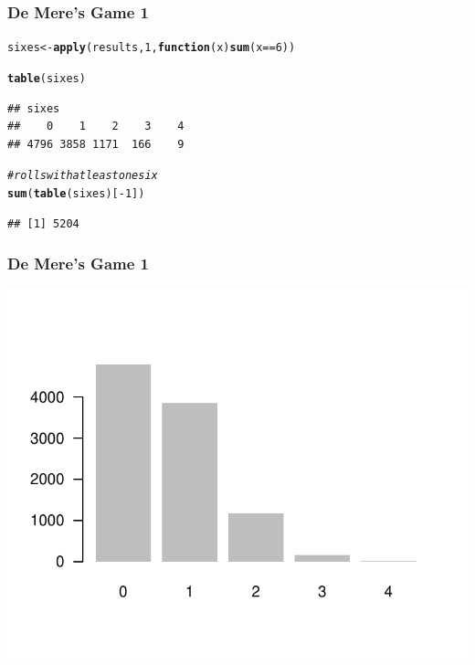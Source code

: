 \documentclass[12pt]{beamer}\usepackage[]{graphicx}\usepackage[]{color}
\makeatletter
\newcommand{\hlnum}[1]{\textcolor[rgb]{0.686,0.059,0.569}{#1}}%
\newcommand{\hlcom}[1]{\textcolor[rgb]{0.678,0.584,0.686}{\textit{#1}}}%
\newcommand{\hlopt}[1]{\textcolor[rgb]{0,0,0}{#1}}%
\newcommand{\hlstd}[1]{\textcolor[rgb]{0.345,0.345,0.345}{#1}}%
\newcommand{\hlkwa}[1]{\textcolor[rgb]{0.161,0.373,0.58}{\textbf{#1}}}%
\newcommand{\hlkwb}[1]{\textcolor[rgb]{0.69,0.353,0.396}{#1}}%
\newcommand{\hlkwc}[1]{\textcolor[rgb]{0.333,0.667,0.333}{#1}}%
\newcommand{\hlkwd}[1]{\textcolor[rgb]{0.737,0.353,0.396}{\textbf{#1}}}%
\newenvironment{kframe}{%
 \def\at@end@of@kframe{}%
 \ifinner\ifhmode%
  \def\at@end@of@kframe{\end{minipage}}%
  \begin{minipage}{\columnwidth}%
 \fi\fi%
 \def\FrameCommand##1{\hskip\@totalleftmargin \hskip-\fboxsep
 \colorbox{shadecolor}{##1}\hskip-\fboxsep
     \hskip-\linewidth \hskip-\@totalleftmargin \hskip\columnwidth}%
 \MakeFramed {\advance\hsize-\width
   \@totalleftmargin\z@ \linewidth\hsize
   \@setminipage}}%
 {\par\unskip\endMakeFramed%
 \at@end@of@kframe}
\newenvironment{knitrout}{}{} %
\makeatother
\begin{document}
\begin{frame}[fragile]
\frametitle{De Mere's Game 1}

\begin{knitrout}\footnotesize
{}\color{fgcolor}\begin{kframe}
\begin{alltt}
\hlstd{sixes} \hlkwb{<-} \hlkwd{apply}\hlstd{(results,} \hlnum{1}\hlstd{,} \hlkwa{function}\hlstd{(}\hlkwc{x}\hlstd{)} \hlkwd{sum}\hlstd{(x} \hlopt{==} \hlnum{6}\hlstd{))}

\hlkwd{table}\hlstd{(sixes)}
\end{alltt}
\begin{verbatim}
## sixes
##    0    1    2    3    4 
## 4796 3858 1171  166    9
\end{verbatim}
\end{kframe}
\end{knitrout}

\pause
\begin{knitrout}\footnotesize
{}\color{fgcolor}\begin{kframe}
\begin{alltt}
\hlcom{# rolls with at least one six}
\hlkwd{sum}\hlstd{(}\hlkwd{table}\hlstd{(sixes)[}\hlopt{-}\hlnum{1}\hlstd{])}
\end{alltt}
\begin{verbatim}
## [1] 5204
\end{verbatim}
\end{kframe}
\end{knitrout}

\end{frame}


\begin{frame}[fragile]
\frametitle{De Mere's Game 1}

\begin{knitrout}\footnotesize
{}\color{fgcolor}

{\centering \includegraphics[width=.7\linewidth,height=.6\linewidth]{figure/unnamed-chunk-58-1} 

}



\end{knitrout}

\end{frame}
\end{document}
